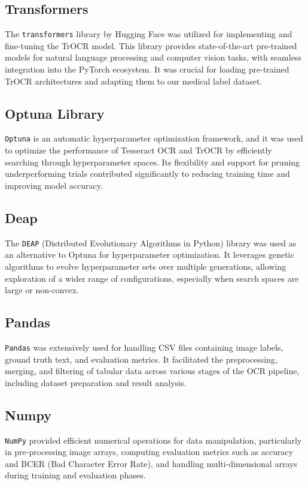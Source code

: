 \subsection{Transformers}
The \texttt{transformers} library by Hugging Face was utilized for implementing and fine-tuning the TrOCR model. This library provides state-of-the-art pre-trained models for natural language processing and computer vision tasks, with seamless integration into the PyTorch ecosystem. It was crucial for loading pre-trained TrOCR architectures and adapting them to our medical label dataset.

\subsection{Optuna Library}
\texttt{Optuna} is an automatic hyperparameter optimization framework, and it was used to optimize the performance of Tesseract OCR and TrOCR by efficiently searching through hyperparameter spaces. Its flexibility and support for pruning underperforming trials contributed significantly to reducing training time and improving model accuracy.

\subsection{Deap}
The \texttt{DEAP} (Distributed Evolutionary Algorithms in Python) library was used as an alternative to Optuna for hyperparameter optimization. It leverages genetic algorithms to evolve hyperparameter sets over multiple generations, allowing exploration of a wider range of configurations, especially when search spaces are large or non-convex.

\subsection{Pandas}
\texttt{Pandas} was extensively used for handling CSV files containing image labels, ground truth text, and evaluation metrics. It facilitated the preprocessing, merging, and filtering of tabular data across various stages of the OCR pipeline, including dataset preparation and result analysis.

\subsection{Numpy}
\texttt{NumPy} provided efficient numerical operations for data manipulation, particularly in pre-processing image arrays, computing evaluation metrics such as accuracy and BCER (Bad Character Error Rate), and handling multi-dimensional arrays during training and evaluation phases.


